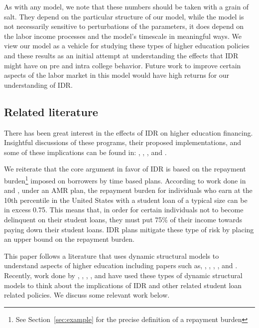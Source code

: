   As with any model, we note that these numbers should be taken with a grain of salt. They depend on
  the particular structure of our model, while the model is not necessarily sensitive to
  perturbations of the parameters, it does depend on the labor income processes and the model's
  timescale in meaningful ways. We view our model as a vehicle for studying these types of higher
  education policies and these results as an initial attempt at understanding the effects that IDR
  might have on pre and intra college behavior. Future work to improve certain aspects of the labor
  market in this model would have high returns for our understanding of IDR.


\subsection{Related literature}

  There has been great interest in the effects of IDR on higher education financing. Insightful
  discussions of these programs, their proposed implementations, and some of these implications can
  be found in: \cite{ChapmanHarding1993}, \cite{Chapman1994}, \cite{BarrChapmanDeardenDynarski2018},
  and \cite{Dynarski2014}.

  We reiterate that the core argument in favor of IDR is based on the repayment burden\footnote{See
  Section~\ref{sec:example} for the precise definition of a repayment burden} imposed on borrowers
  by time based plans. According to work done in \cite{ChapmanDearden2017} and
  \cite{ChapmanLounkaew2015}, under an AMR plan, the repayment burden for individuals who earn at
  the 10th percentile in the United States with a student loan of a typical size can be in excess
  0.75. This means that, in order for certain individuals not to become delinquent on their student
  loans, they must put 75\% of their income towards paying down their student loans. IDR plans
  mitigate these type of risk by placing an upper bound on the repayment burden.

  This paper follows a literature that uses dynamic structural models to understand aspects of
  higher education including papers such as, \cite{KeaneWolpin2001}, \cite{Arcidiacono2005},
  \cite{Ionescu2009}, \cite{ChatterjeeIonescu2012}, and \cite{FerreyraGarrigaManuelli2017}.
  Recently, work done by \cite{FindeisenSachs2016}, \cite{HeijdraKindermannReijnders2017},
  \cite{Ji2017}, \cite{LuoMongey2019}, and \cite{Liu2016} have used these types of dynamic
  structural models to think about the implications of IDR and other related student loan related
  policies. We discuss some relevant work below.

